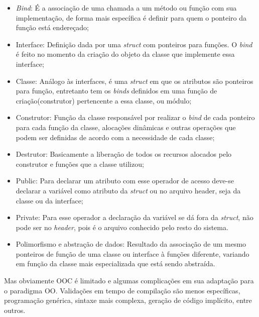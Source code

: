\begin{itemize}
\item \emph{Bind}: É a associação de uma chamada a um método ou função com sua implementação, de forma mais específica é definir para quem o ponteiro da função está endereçado;
\item Interface: Definição dada por uma \emph{struct} com ponteiros para funções. O \emph{bind} é feito no momento da criação do objeto da classe que implemente essa interface;
\item Classe: Análogo às interfaces, é uma \emph{struct} em que os atributos são ponteiros para função, entretanto tem os \emph{binds} definidos em uma função de criação(construtor) pertencente a essa classe, ou módulo;
\item Construtor: Função da classe responsável por realizar o \emph{bind} de cada ponteiro para cada função da classe, alocações dinâmicas e outras operações que podem ser definidas de acordo com a necessidade de cada classe;
\item Destrutor: Basicamente a liberação de todos os recursos alocados pelo construtor e funções que a classe utilizou;
\item Public: Para declarar um atributo com esse operador de acesso deve-se declarar a variável como atributo da \emph{struct} ou no arquivo header, seja da classe ou da interface;
\item Private: Para esse operador a declaração da variável se dá fora da \emph{struct}, não pode ser no \emph{header}, pois é o arquivo conhecido pelo resto do sistema.
\item Polimorfismo e abstração de dados: Resultado da associação de um mesmo ponteiros de função de uma classe ou interface à funções diferente, variando em função da classe mais especializada que está sendo abstraída.
\end{itemize}

Mas obviamente OOC é limitado e algumas complicações em sua adaptação para o paradigma OO. Validações em tempo de compilação são menos específicas, programação genérica, sintaxe mais complexa, geração de código implícito, entre outros.

